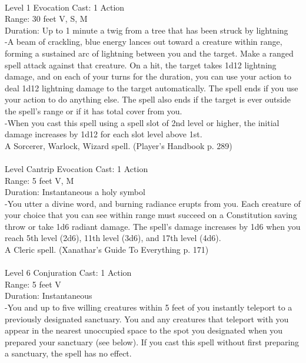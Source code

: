 \documentclass[10pt,twocolumn]{report}
\begin{document}
 \\
Level 1 \quad Evocation \quad Cast: 1 Action\\
Range: 30 feet \quad V, S, M\\
Duration: Up to 1 minute \quad a twig from a tree that has been struck by lightning\\
-A beam of crackling, blue energy lances out toward a creature within range, forming a sustained arc of lightning between you and the target.
Make a ranged spell attack against that creature. On a hit, the target takes 1d12 lightning damage, and on each of your turns for the duration, you can use your action to deal 1d12 lightning damage to the target automatically. The spell ends if you use your action to do anything else. The spell also ends if the target is ever outside the spell’s range or if it has total cover from you.\\
-When you cast this spell using a spell slot of 2nd level or higher, the initial damage increases by 1d12 for each slot level above 1st.\\
A Sorcerer, Warlock, Wizard spell. (Player's Handbook p. 289) \\


 \\
Level Cantrip \quad Evocation \quad Cast: 1 Action\\
Range: 5 feet \quad V, M\\
Duration: Instantaneous \quad a holy symbol\\
-You utter a divine word, and burning radiance erupts from you. Each creature of your choice that you can see within range must succeed on a Constitution saving throw or take 1d6 radiant damage.
The spell’s damage increases by 1d6 when you reach 5th level (2d6), 11th level (3d6), and 17th level (4d6).\\
A Cleric spell. (Xanathar's Guide To Everything p. 171) \\


 \\
Level 6 \quad Conjuration \quad Cast: 1 Action\\
Range: 5 feet \quad V\\
Duration: Instantaneous \quad \\
-You and up to five willing creatures within 5 feet of you instantly teleport to a previously designated sanctuary.
You and any creatures that teleport with you appear in the nearest unoccupied space to the spot you designated when you prepared your sanctuary (see below). If you cast this spell without first preparing a sanctuary, the spell has no effect.
\end{document}
